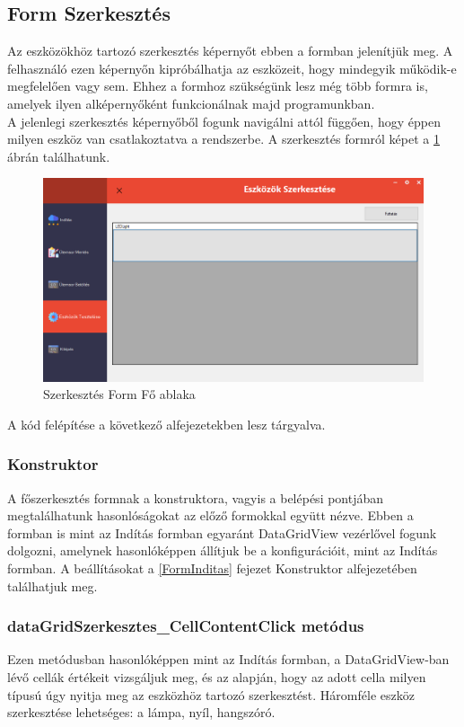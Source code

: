 \documentclass[tocnopagenum]{thesis-ekf}
\theoremstyle{definition}
\theoremstyle{remark}
\begin{document}
	\subsection{Form Szerkesztés}
	\label{Form Szerkesztes}
	Az eszközökhöz tartozó szerkesztés képernyőt ebben a formban jelenítjük meg. A felhasználó ezen képernyőn kipróbálhatja az eszközeit, hogy mindegyik működik-e megfelelően vagy sem. Ehhez a formhoz szükségünk lesz még több formra is, amelyek ilyen alképernyőként funkcionálnak majd programunkban.
	\\
	A jelenlegi szerkesztés képernyőből fogunk navigálni attól függően, hogy éppen milyen eszköz van csatlakoztatva a rendszerbe. A szerkesztés formról képet a \ref{fig:SzerkformFo} ábrán találhatunk.
	\begin{figure}[H]	
		\centering
		\includegraphics[scale=0.5]{FormSzerk_page}
		\caption[Szerkesztés Form Fő ablaka]{Szerkesztés Form Fő ablaka}
		\label{fig:SzerkformFo}
	\end{figure}
	A kód felépítése a következő alfejezetekben lesz tárgyalva.
	\subsubsection{Konstruktor}
	A főszerkesztés formnak a konstruktora, vagyis a belépési pontjában megtalálhatunk hasonlóságokat az előző formokkal együtt nézve.
	Ebben a formban is mint az Indítás formban egyaránt DataGridView vezérlővel fogunk dolgozni, amelynek hasonlóképpen állítjuk be a konfigurációit, mint az Indítás formban. A beállításokat a \ref{FormInditas} fejezet Konstruktor alfejezetében találhatjuk meg.
	\subsubsection{dataGridSzerkesztes\_CellContentClick metódus}
	Ezen metódusban hasonlóképpen mint az Indítás formban, a DataGridView-ban lévő cellák értékeit vizsgáljuk meg, és az alapján, hogy az adott cella milyen típusú úgy nyitja meg az eszközhöz tartozó  szerkesztést. Háromféle eszköz szerkesztése lehetséges: a lámpa, nyíl, hangszóró.
\end{document}
